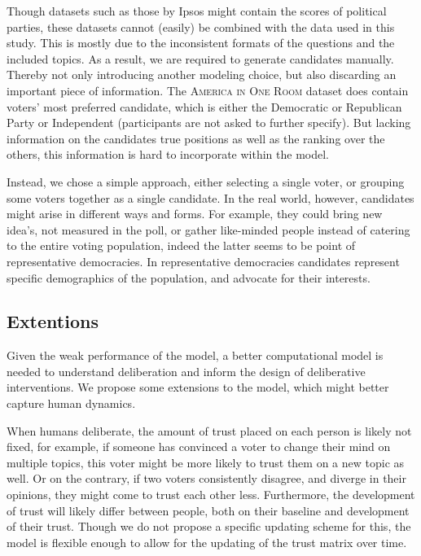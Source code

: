Though datasets such as those by Ipsos might contain the scores of political
parties, these datasets cannot (easily) be combined with the data used in this
study. This is mostly due to the inconsistent formats of the questions and the
included topics. As a result, we are required to generate candidates manually.
Thereby not only introducing another modeling choice, but also discarding an
important piece of information. The \textsc{America in One Room} dataset does
contain voters' most preferred candidate, which is either the Democratic or
Republican Party or Independent (participants are not asked to further
specify). But lacking information on the candidates true positions as well as
the ranking over the others, this information is hard to incorporate within the
model. 

Instead, we chose a simple approach, either selecting a single
voter, or grouping some voters together as a single candidate. In the real
world, however, candidates might arise in different ways and forms. For
example, they could bring new idea's, not measured in the poll, or gather
like-minded people instead of catering to the entire voting population, indeed
the latter seems to be point of representative democracies. In representative
democracies candidates represent specific demographics of the population, and
advocate for their interests.


\subsection{Extentions}


Given the weak performance of the model, a better computational model is needed
to understand deliberation and inform the design of deliberative interventions.
We propose some extensions to the model, which might better capture human
dynamics.

When humans deliberate, the amount of trust placed on each person is likely not
fixed, for example, if someone has convinced a voter to change their mind on
multiple topics, this voter might be more likely to trust them on a new topic
as well. Or on the contrary, if two voters consistently disagree, and diverge
in their opinions, they might come to trust each other less. Furthermore, the
development of trust will likely differ between people, both on their baseline
and development of their trust. Though we do not propose a specific updating
scheme for this, the model is flexible enough to allow for the updating of the
trust matrix over time. 



